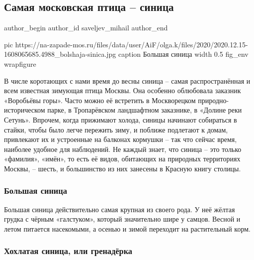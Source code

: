  
 
 
 
 
 
\subsection{Самая московская птица – синица}
\label{sec:16_12_2020.news.ru.zapad_moskva.saveljev_mihail.1.moskva_sinica}
\ifcmt
	author_begin
   author_id saveljev_mihail
	author_end
\fi

\ifcmt
  pic https://na-zapade-mos.ru/files/data/user/AiF/olga.k/files/2020/2020.12.15-1608065685.4988_bolshaja-sinica.jpg
  caption Большая синица
  width 0.5
  fig_env wrapfigure
\fi

В числе коротающих с нами время до весны синица – самая распространённая и всем
известная зимующая птица Москвы. Она особенно облюбовала заказник «Воробьёвы
горы». Часто можно её встретить в Москворецком природно-историческом парке, в
Тропарёвском ландшафтном заказнике, в «Долине реки Сетунь». Впрочем, когда
прижимают холода, синицы начинают собираться в стайки, чтобы было легче
пережить зиму, и поближе подлетают к домам, привлекают их и устроенные на
балконах кормушки – так что сейчас время, наиболее удобное для наблюдений. Не
каждый знает, что синица – это только «фамилия», «имён», то есть её видов,
обитающих на природных территориях Москвы, – шесть, и большинство из них
занесены в Красную книгу столицы.

\subsubsection{Большая синица}

Большая синица действительно самая крупная из своего рода. У неё жёлтая грудка
с чёрным «галстуком», который значительно шире у самцов. Весной и летом
питается насекомыми, а осенью и зимой переходит на растительный корм.

\subsubsection{Хохлатая синица, или гренадёрка}

